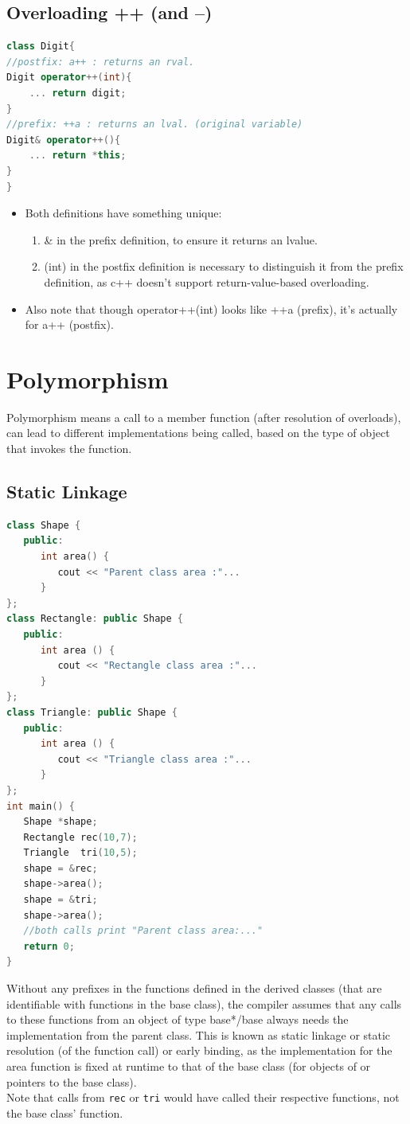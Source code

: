 \documentclass{report}
\begin{document}
\subsection{Overloading ++ (and --)}
\begin{lstlisting}[language=C++]
class Digit{
//postfix: a++ : returns an rval.
Digit operator++(int){
    ... return digit;
}
//prefix: ++a : returns an lval. (original variable)
Digit& operator++(){
    ... return *this;
}
}
\end{lstlisting}
\begin{itemize}
\item Both definitions have something unique:
\begin{enumerate}
    \item \& in the prefix definition, to ensure it returns an lvalue.
    \item (int) in the postfix definition is necessary to distinguish it from the prefix definition, as c++ doesn't support return-value-based overloading.
\end{enumerate}
\item Also note that though operator++(int) looks like ++a (prefix), it's actually for a++ (postfix).
\end{itemize}
\section{Polymorphism}
Polymorphism means a call to a member function (after resolution of overloads), can lead to different implementations being called, based on the type of object that invokes the function.
\subsection{Static Linkage}
\begin{lstlisting}[language=C++]
class Shape {
   public:
      int area() {
         cout << "Parent class area :"...
      }
};
class Rectangle: public Shape {
   public:
      int area () { 
         cout << "Rectangle class area :"...
      }
};
class Triangle: public Shape {
   public:
      int area () { 
         cout << "Triangle class area :"... 
      }
};
int main() {
   Shape *shape;
   Rectangle rec(10,7);
   Triangle  tri(10,5);
   shape = &rec;
   shape->area();
   shape = &tri;   
   shape->area();
   //both calls print "Parent class area:..."
   return 0;
}
\end{lstlisting}
Without any prefixes in the functions defined in the derived classes (that are identifiable with functions in the base class),
the compiler assumes that any calls to these functions from an object of type base*/base always needs the implementation from the parent class. This is known as static linkage or static resolution (of the function call) or early binding, as the implementation for the area function is fixed at runtime to that of the base class (for objects of or pointers to the base class).\\
Note that calls from \texttt{rec} or \texttt{tri} would have called their respective functions, not the base class' function.
\end{document}
